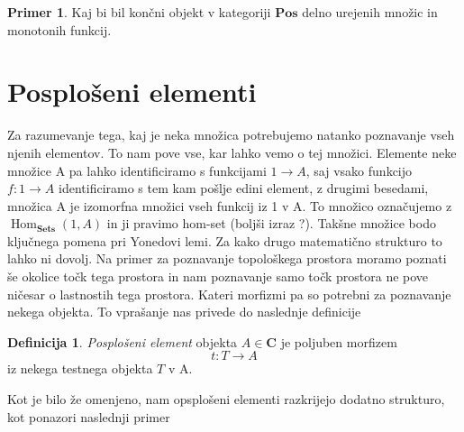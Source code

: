 \documentclass[12pt,a4paper]{book}
\theoremstyle{definition}
\newtheorem{definicija}{Definicija}[chapter]
\theoremstyle{plain}
\theoremstyle{definition}
\newtheorem{primer}{Primer}[section]
\theoremstyle{remark}
\newcommand{\cat}[1]{\textbf{#1}}
\DeclareMathOperator{\Hom}{Hom}
\begin{document}

\begin{primer}
Kaj bi bil končni objekt v kategoriji $\cat{Pos}$ delno urejenih množic in monotonih funkcij. 
\end{primer}

\section{Posplošeni elementi}
Za razumevanje tega, kaj je neka množica potrebujemo natanko poznavanje vseh njenih elementov. To nam pove vse, kar lahko vemo o tej množici. Elemente neke množice A pa lahko identificiramo s funkcijami $1 \to A$, saj vsako funkcijo $f : 1 \to A$ identificiramo s tem kam pošlje edini element, z drugimi besedami, množica A je izomorfna množici vseh funkcij iz 1 v A. To množico označujemo z $\Hom_{\cat{Sets}} (1,A)$ in ji pravimo hom-set (boljši izraz ?). Takšne množice bodo ključnega pomena pri Yonedovi lemi.
Za kako drugo matematično strukturo to lahko ni dovolj. Na primer za poznavanje topološkega prostora moramo poznati še okolice točk tega prostora in nam poznavanje samo točk prostora ne pove ničesar o lastnostih tega prostora. Kateri morfizmi pa so potrebni za poznavanje nekega objekta. To vprašanje nas privede do naslednje definicije

\begin{definicija}
 \textit{Posplošeni element} objekta $A \in \cat{C}$ je poljuben morfizem 
$$t : T \to A$$
iz nekega testnega objekta $T$ v A.
\end{definicija}
Kot je bilo že omenjeno, nam opsplošeni elementi razkrijejo dodatno strukturo, kot ponazori naslednji primer
\end{document}
